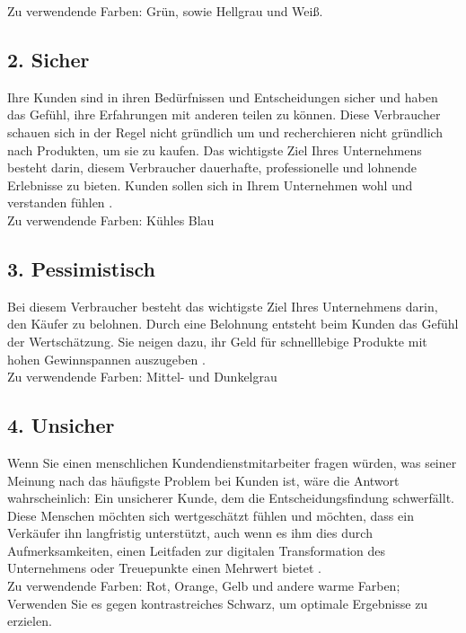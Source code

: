 \documentclass[./dokumentation.tex]{subfiles}
\begin{document}
Zu verwendende Farben: Grün, sowie Hellgrau und Weiß.

\subsection{2. Sicher}
Ihre Kunden sind in ihren Bedürfnissen und Entscheidungen sicher und haben das Gefühl, ihre Erfahrungen mit anderen teilen zu können. Diese Verbraucher schauen sich in der Regel nicht gründlich um und recherchieren nicht gründlich nach Produkten, um sie zu kaufen. Das wichtigste Ziel Ihres Unternehmens besteht darin, diesem Verbraucher dauerhafte, professionelle und lohnende Erlebnisse zu bieten. Kunden sollen sich in Ihrem Unternehmen wohl und verstanden fühlen \cite{designbro}. \\

Zu verwendende Farben: Kühles Blau\\

\subsection{3. Pessimistisch}
Bei diesem Verbraucher besteht das wichtigste Ziel Ihres Unternehmens darin, den Käufer zu belohnen. Durch eine Belohnung entsteht beim Kunden das Gefühl der Wertschätzung. Sie neigen dazu, ihr Geld für schnelllebige Produkte mit hohen Gewinnspannen auszugeben \cite{designbro}. \\

Zu verwendende Farben: Mittel- und Dunkelgrau\\
\subsection{4. Unsicher}
Wenn Sie einen menschlichen Kundendienstmitarbeiter fragen würden, was seiner Meinung nach das häufigste Problem bei Kunden ist, wäre die Antwort wahrscheinlich: Ein unsicherer Kunde, dem die Entscheidungsfindung schwerfällt.\\

Diese Menschen möchten sich wertgeschätzt fühlen und möchten, dass ein Verkäufer ihn langfristig unterstützt, auch wenn es ihm dies durch Aufmerksamkeiten, einen Leitfaden zur digitalen Transformation des Unternehmens oder Treuepunkte einen Mehrwert bietet \cite{designbro}. \\

Zu verwendende Farben: Rot, Orange, Gelb und andere warme Farben; Verwenden Sie es gegen kontrastreiches Schwarz, um optimale Ergebnisse zu erzielen.\\
\end{document}
